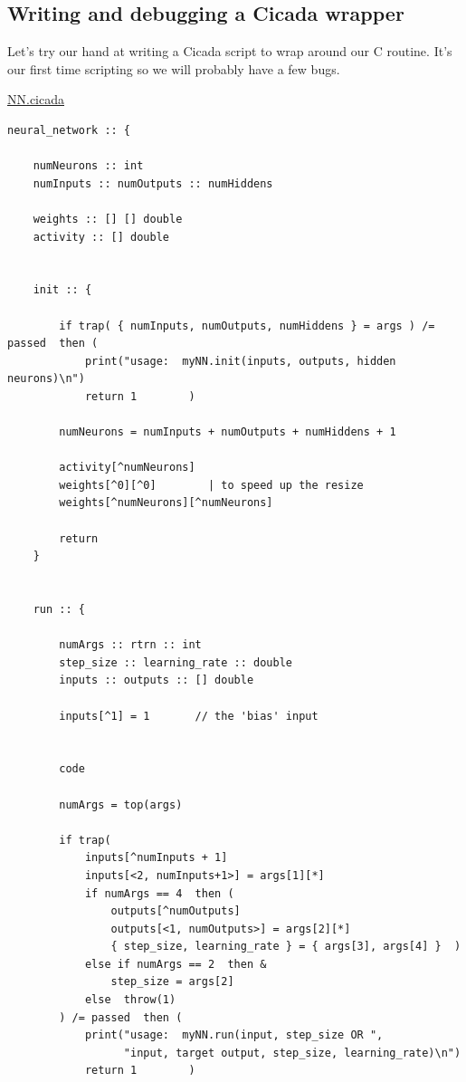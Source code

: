 \documentclass{article}
\newenvironment{longcode}{
       \begin{list}{}{
               \setlength{\leftmargin}{0in}
               \setlength{\rightmargin}{0in}
               \setlength{\topsep}{.2in}
       }
       \small
       \item[] }
       { \end{list}   }
\begin{document}
\subsection{Writing and debugging a Cicada wrapper}

Let's try our hand at writing a Cicada script to wrap around our C routine.  It's our first time scripting so we will probably have a few bugs.\\\vspace{.2in}

\noindent \underline{NN.cicada}

\begin{longcode} \begin{verbatim}
neural_network :: {
    
    numNeurons :: int
    numInputs :: numOutputs :: numHiddens
    
    weights :: [] [] double
    activity :: [] double
    
    
    init :: {
        
        if trap( { numInputs, numOutputs, numHiddens } = args ) /= passed  then (
            print("usage:  myNN.init(inputs, outputs, hidden neurons)\n")
            return 1        )
        
        numNeurons = numInputs + numOutputs + numHiddens + 1
        
        activity[^numNeurons]
        weights[^0][^0]        | to speed up the resize
        weights[^numNeurons][^numNeurons]
        
        return
    }
    
    
    run :: {
        
        numArgs :: rtrn :: int
        step_size :: learning_rate :: double
        inputs :: outputs :: [] double
        
        inputs[^1] = 1       // the 'bias' input
        
        
        code
        
        numArgs = top(args)
        
        if trap(
            inputs[^numInputs + 1]
            inputs[<2, numInputs+1>] = args[1][*]
            if numArgs == 4  then (
                outputs[^numOutputs]
                outputs[<1, numOutputs>] = args[2][*]
                { step_size, learning_rate } = { args[3], args[4] }  )
            else if numArgs == 2  then &
                step_size = args[2]
            else  throw(1)
        ) /= passed  then (
            print("usage:  myNN.run(input, step_size OR ",
                  "input, target output, step_size, learning_rate)\n")
            return 1        )
        

\end{verbatim}
\end{longcode}
\end{document}
